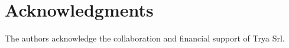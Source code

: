 \section{Acknowledgments}

\sloppy
The authors acknowledge the collaboration and financial support of Trya Srl.
\fussy